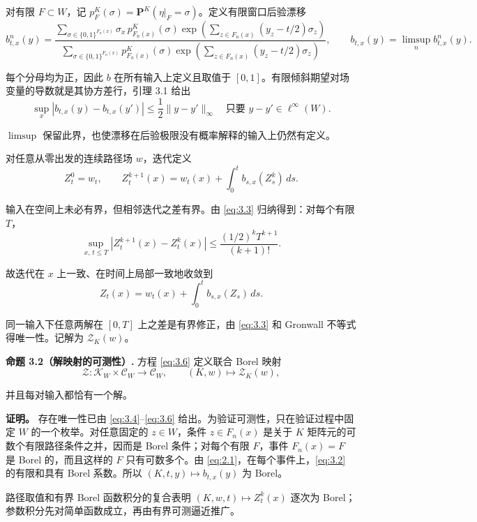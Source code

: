 \documentclass[UTF8,zihao=-4,a4paper]{ctexart}
\numberwithin{equation}{section}
\begin{document}
对有限 \(F\subset W\)，记
\(p_F^K(\sigma)=\mathbf P^K(\eta|_F=\sigma)\)。定义有限窗口后验漂移
\[
 b^n_{t,x}(y)=
 \frac{\displaystyle\sum_{\sigma\in\{0,1\}^{F_n(x)}}
       \sigma_x\,p^K_{F_n(x)}(\sigma)
       \exp\!\left(\sum_{z\in F_n(x)}(y_z-t/2)\sigma_z\right)}
      {\displaystyle\sum_{\sigma\in\{0,1\}^{F_n(x)}}
       p^K_{F_n(x)}(\sigma)
       \exp\!\left(\sum_{z\in F_n(x)}(y_z-t/2)\sigma_z\right)},
 \qquad
 b_{t,x}(y)=\limsup_n b^n_{t,x}(y).
 \tag{3.2}\label{eq:3.2}
\]

每个分母均为正，因此 \(b\) 在所有输入上定义且取值于 \([0,1]\)。有限倾斜期望对场变量的导数就是其协方差行，引理 3.1 给出
\[
 \sup_x|b_{t,x}(y)-b_{t,x}(y')|
 \le\frac12\|y-y'\|_\infty
 \quad\text{只要 }y-y'\in\ell^\infty(W).
 \tag{3.3}\label{eq:3.3}
\]

\(\limsup\) 保留此界，也使漂移在后验极限没有概率解释的输入上仍然有定义。

对任意从零出发的连续路径场 \(w\)，迭代定义
\[
 Z^0_t=w_t,\qquad
 Z^{k+1}_t(x)=w_t(x)+\int_0^t b_{s,x}(Z^k_s)\,ds.
 \tag{3.4}\label{eq:3.4}
\]

输入在空间上未必有界，但相邻迭代之差有界。由 \eqref{eq:3.3} 归纳得到：对每个有限 \(T\)，
\[
 \sup_{x,\,t\le T}|Z^{k+1}_t(x)-Z^k_t(x)|
 \le\frac{(1/2)^kT^{k+1}}{(k+1)!}.
 \tag{3.5}\label{eq:3.5}
\]

故迭代在 \(x\) 上一致、在时间上局部一致地收敛到
\[
 Z_t(x)=w_t(x)+\int_0^t b_{s,x}(Z_s)\,ds.
 \tag{3.6}\label{eq:3.6}
\]

同一输入下任意两解在 \([0,T]\) 上之差是有界修正，由 \eqref{eq:3.3} 和 Gronwall 不等式得唯一性。记解为 \(\mathcal Z_K(w)\)。

\textbf{命题 3.2（解映射的可测性）.} 方程 \eqref{eq:3.6} 定义联合 Borel 映射
\[
 \mathcal Z:\mathscr K_W\times\mathcal C_W\longrightarrow\mathcal C_W,
 \qquad (K,w)\longmapsto\mathcal Z_K(w),
\]

并且每对输入都恰有一个解。

\textbf{证明。} 存在唯一性已由 \eqref{eq:3.4}--\eqref{eq:3.6} 给出。为验证可测性，只在验证过程中固定 \(W\) 的一个枚举。对任意固定的 \(z\in W\)，条件 \(z\in F_n(x)\) 是关于 \(K\) 矩阵元的可数个有限路径条件之并，因而是 Borel 条件；对每个有限 \(F\)，事件 \(F_n(x)=F\) 是 Borel 的，而且这样的 \(F\) 只有可数多个。由 \eqref{eq:2.1}，在每个事件上，\eqref{eq:3.2} 的有限和具有 Borel 系数。所以
\((K,t,y)\mapsto b_{t,x}(y)\) 为 Borel。

路径取值和有界 Borel 函数积分的复合表明
\((K,w,t)\mapsto Z_t^k(x)\) 逐次为 Borel；参数积分先对简单函数成立，再由有界可测逼近推广。
\end{document}
